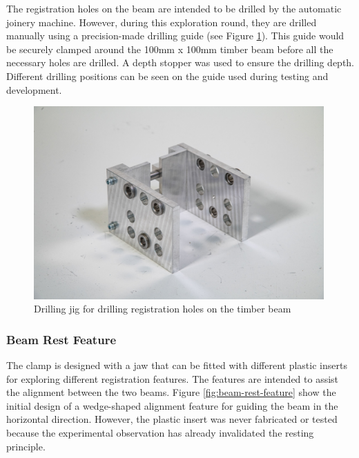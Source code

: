 The registration holes on the beam are intended to be drilled by the automatic joinery machine. However, during this exploration round, they are drilled manually using a precision-made drilling guide (see Figure \ref{fig:drilling-jig}). This guide would be securely clamped around the 100mm x 100mm timber beam before all the necessary holes are drilled. A depth stopper was used to ensure the drilling depth. Different drilling positions can be seen on the guide used during testing and development.

\begin{figure}[h!]
    \centering
    \includegraphics[width=0.99\textwidth]{images/04-3/cl1-pin-drill-jig.jpg}
    \caption{Drilling jig for drilling registration holes on the timber beam}
    \label{fig:drilling-jig}
\end{figure}



\subsubsection{Beam Rest Feature}
\label{subsubsection:exploration-1-beam-rest-feature}

The clamp is designed with a jaw that can be fitted with different plastic inserts for exploring different registration features. The features are intended to assist the alignment between the two beams. Figure \ref{fig:beam-rest-feature} show the initial design of a wedge-shaped alignment feature for guiding the beam in the horizontal direction. However, the plastic insert was never fabricated or tested because the experimental observation  has already invalidated the resting principle.

